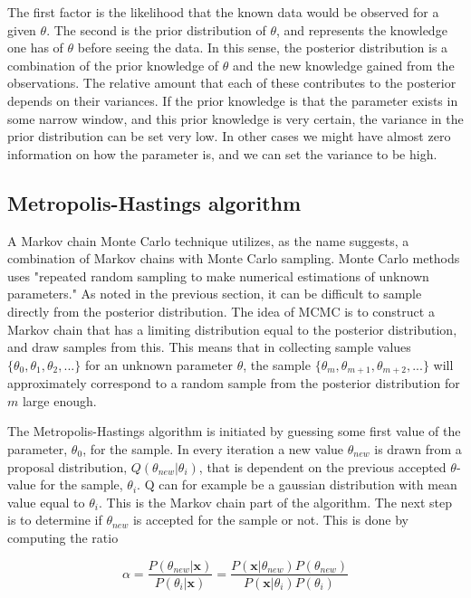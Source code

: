  The first factor is the likelihood that the known data would be observed for a given $\theta$. The second is the prior distribution of $\theta$, and represents the knowledge one has of $\theta$ before seeing the data. In this sense, the posterior distribution is a combination of the prior knowledge of $\theta$ and the new knowledge gained from the observations. The relative amount that each of these contributes to the posterior depends on their variances. If the prior knowledge is that the parameter exists in some narrow window, and this prior knowledge is very certain, the variance in the prior distribution can be set very low. In other cases we might have almost zero information on how the parameter is, and we can set the variance to be high. 

\subsection{Metropolis-Hastings algorithm}
\label{Metropolis}
A Markov chain Monte Carlo technique utilizes, as the name suggests, a combination of Markov chains with Monte Carlo sampling. Monte Carlo methods uses "repeated random sampling to make numerical estimations of unknown parameters."  
As noted in the previous section, it can be difficult to sample directly from the posterior distribution. The idea of MCMC is to construct a Markov chain that has a limiting distribution equal to the posterior distribution, and draw samples from this. This means that in collecting sample values $\{\theta_0, \theta_1, \theta_2,...\}$ for an unknown parameter $\theta$, the sample $\{\theta_m, \theta_{m+1}, \theta_{m+2},...\}$ will approximately correspond to a random sample from the posterior distribution for $m$ large enough. 

The Metropolis-Hastings algorithm is initiated by guessing some first value of the parameter, $\theta_0$, for the sample. In every iteration a new value $\theta_{new}$ is drawn from a proposal distribution, $Q(\theta_{new}|\theta_i)$, that is dependent on the previous accepted $\theta$-value for the sample, $\theta_i$. Q can for example be a gaussian distribution with mean value equal to $\theta_i$. This is the Markov chain part of the algorithm. The next step is to determine if $\theta_{new}$ is accepted for the sample or not. This is done by computing the ratio

\begin{equation}
    \alpha = 
    \frac{P(\theta_{new}|{\bm x})}{P(\theta_i|{\bm x})} = 
    \frac{P({\bm x}|\theta_{new})P(\theta_{new})}{P({\bm x}|\theta_{i})P(\theta_{i})}
\end{equation}

